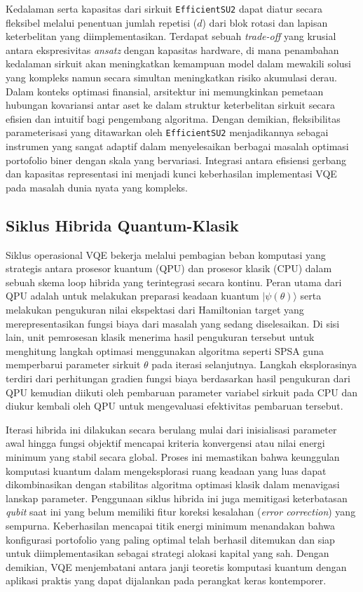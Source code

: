 Kedalaman serta kapasitas dari sirkuit \texttt{EfficientSU2} dapat diatur secara fleksibel melalui penentuan jumlah repetisi ($d$) dari blok rotasi dan lapisan keterbelitan yang diimplementasikan. Terdapat sebuah \textit{trade-off} yang krusial antara ekspresivitas \textit{ansatz} dengan kapasitas hardware, di mana penambahan kedalaman sirkuit akan meningkatkan kemampuan model dalam mewakili solusi yang kompleks namun secara simultan meningkatkan risiko akumulasi derau. Dalam konteks optimasi finansial, arsitektur ini memungkinkan pemetaan hubungan kovariansi antar aset ke dalam struktur keterbelitan sirkuit secara efisien dan intuitif bagi pengembang algoritma. Dengan demikian, fleksibilitas parameterisasi yang ditawarkan oleh \texttt{EfficientSU2} menjadikannya sebagai instrumen yang sangat adaptif dalam menyelesaikan berbagai masalah optimasi portofolio biner dengan skala yang bervariasi. Integrasi antara efisiensi gerbang dan kapasitas representasi ini menjadi kunci keberhasilan implementasi VQE pada masalah dunia nyata yang kompleks.

\subsection{Siklus Hibrida Quantum-Klasik}
Siklus operasional VQE bekerja melalui pembagian beban komputasi yang strategis antara prosesor kuantum (QPU) dan prosesor klasik (CPU) dalam sebuah skema loop hibrida yang terintegrasi secara kontinu. Peran utama dari QPU adalah untuk melakukan preparasi keadaan kuantum $|\psi(\theta)\rangle$ serta melakukan pengukuran nilai ekspektasi dari Hamiltonian target yang merepresentasikan fungsi biaya dari masalah yang sedang diselesaikan. Di sisi lain, unit pemrosesan klasik menerima hasil pengukuran tersebut untuk menghitung langkah optimasi menggunakan algoritma seperti SPSA guna memperbarui parameter sirkuit $\theta$ pada iterasi selanjutnya. Langkah eksplorasinya terdiri dari perhitungan gradien fungsi biaya berdasarkan hasil pengukuran dari QPU kemudian diikuti oleh pembaruan parameter variabel sirkuit pada CPU dan diukur kembali oleh QPU untuk mengevaluasi efektivitas pembaruan tersebut.

Iterasi hibrida ini dilakukan secara berulang mulai dari inisialisasi parameter awal hingga fungsi objektif mencapai kriteria konvergensi atau nilai energi minimum yang stabil secara global. Proses ini memastikan bahwa keunggulan komputasi kuantum dalam mengeksplorasi ruang keadaan yang luas dapat dikombinasikan dengan stabilitas algoritma optimasi klasik dalam menavigasi lanskap parameter. Penggunaan siklus hibrida ini juga memitigasi keterbatasan \textit{qubit} saat ini yang belum memiliki fitur koreksi kesalahan (\textit{error correction}) yang sempurna. Keberhasilan mencapai titik energi minimum menandakan bahwa konfigurasi portofolio yang paling optimal telah berhasil ditemukan dan siap untuk diimplementasikan sebagai strategi alokasi kapital yang sah. Dengan demikian, VQE menjembatani antara janji teoretis komputasi kuantum dengan aplikasi praktis yang dapat dijalankan pada perangkat keras kontemporer.
